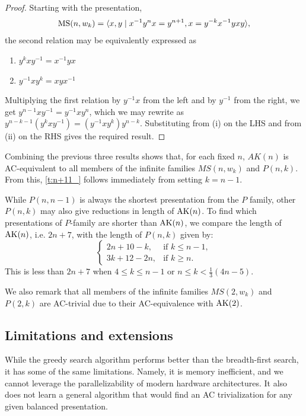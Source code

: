 \begin{proof}
    Starting with the presentation,
        \[
        \text{MS}(n, w_k) = \langle x, y \mid x^{-1} y^n x = y^{n+1}, x = y^{-k} x^{-1} y x y\rangle,
        \]
    the second relation may be equivalently expressed as 
    \begin{enumerate}[label=(\roman*)]
        \item $y^{k}xy^{-1}=x^{-1}yx$
        \item $y^{-1}xy^{k}=xyx^{-1}$
    \end{enumerate}
    Multiplying the first relation by $y^{-1} x$ from the left and by $y^{-1}$ from the right, we get $y^{n-1} x y^{-1} = y^{-1} x y^{n}$, which we may rewrite as $y^{n-k-1} \left(y^k x y^{-1}\right) = \left(y^{-1} x y^{k}\right) y^{n-k}$. Substituting from (i) on the LHS and from (ii) on the RHS gives the required result.
\end{proof}

Combining the previous three results shows that, for each fixed $n$, $AK(n)$ is AC-equivalent to all members of the infinite families $MS(n, w_k)$ and $P(n, k)$. From this, \cref{t:n+11_} follows immediately from setting $k = n - 1$.

While $P(n, n-1)$ is always the shortest presentation from the $P$ family, other $P(n, k)$ may also give reductions in length of $\text{AK}(n)$. To find which presentations of $P$-family are shorter than $\text{AK}(n)$, we compare the length of $\text{AK}(n)$, i.e. $2n + 7$, with the length of $P(n, k)$ given by:
\[
    \begin{cases} 
        2n + 10 - k, & \text{if } k \leq n-1, \\
        3k + 12 - 2n, & \text{if } k \geq n.
    \end{cases}
\]
This is less than $2n+7$ when $4 \leq k \leq n-1$ or $n \leq k < \frac{1}{3} \left(4n-5 \right)$. 

We also remark that all members of the infinite families $MS(2, w_k)$ and $P(2, k)$ are AC-trivial due to their AC-equivalence with $\text{AK}(2)$.



\subsection{Limitations and extensions}

While the greedy search algorithm performs better than the breadth-first search, it has some of the same limitations.
Namely, it is memory inefficient, and we cannot leverage the parallelizability of modern hardware architectures.
It also does not learn a general algorithm that would find an AC trivialization for any given balanced presentation.

